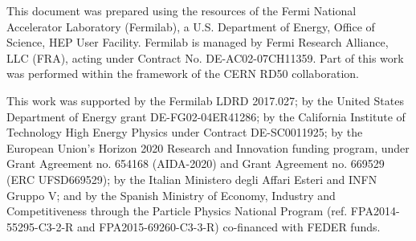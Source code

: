 \documentclass[preprint,1p]{elsarticle}
\begin{document}
This document was prepared using the resources of the Fermi National Accelerator
Laboratory (Fermilab), a U.S. Department of Energy, Office of Science, HEP User
Facility. Fermilab is managed by Fermi Research Alliance, LLC (FRA), acting
under Contract No. DE-AC02-07CH11359. Part of this work was performed within the
framework of the CERN RD50 collaboration.

This work was supported by the Fermilab LDRD 2017.027; by the United States
Department of Energy grant DE-FG02-04ER41286; by the California Institute of
Technology High Energy Physics under Contract DE-SC0011925; by the European
Union's Horizon 2020 Research and Innovation funding program, under Grant
Agreement no. 654168 (AIDA-2020) and Grant Agreement no. 669529 (ERC
UFSD669529); by the Italian Ministero degli Affari Esteri and INFN Gruppo V; and
by the Spanish Ministry of Economy, Industry and Competitiveness through the
Particle Physics National Program (ref. FPA2014-55295-C3-2-R and
FPA2015-69260-C3-3-R) co-financed with FEDER funds.









{}





\end{document}
